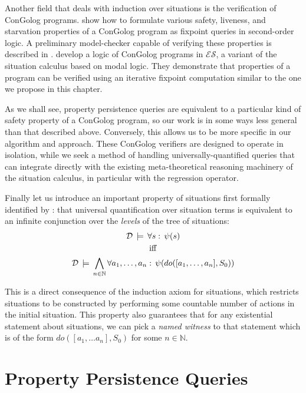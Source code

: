 Another field that deals with induction over situations is the verification
of ConGolog programs. \citet{ternovska97congolog_fixpoint} show how
to formulate various safety, liveness, and starvation properties of
a ConGolog program as fixpoint queries in second-order logic. A preliminary
model-checker capable of verifying these properties is described in
\citep{ternovska02congolog_model_checker}. \citet{classen08golog_properties}
develop a logic of ConGolog programs in $\mathcal{ES}$, a variant
of the situation calculus based on modal logic. They demonstrate that
properties of a program can be verified using an iterative fixpoint
computation similar to the one we propose in this chapter.

As we shall see, property persistence queries are equivalent to a
particular kind of safety property of a ConGolog program, so our work
is in some ways less general than that described above. Conversely,
this allows us to be more specific in our algorithm and approach.
These ConGolog verifiers are designed to operate in isolation, while
we seek a method of handling universally-quantified queries that can
integrate directly with the existing meta-theoretical reasoning machinery
of the situation calculus, in particular with the regression operator.

Finally let us introduce an important property of situations first
formally identified by \citet{savelli06sc_quantum_levels}: that universal
quantification over situation terms is equivalent to an infinite conjunction
over the \emph{levels} of the tree of situations:\begin{gather*}
\mathcal{D}\,\models\,\forall s:\,\psi(s)\\
\mathrm{iff}\\
\mathcal{D}\,\models\,\bigwedge_{n\in\mathbb{N}}\forall a_{1},\dots,a_{n}:\,\psi(do([a_{1},\dots,a_{n}],S_{0}))\end{gather*}


This is a direct consequence of the induction axiom for situations,
which restricts situations to be constructed by performing some countable
number of actions in the initial situation. This property also guarantees
that for any existential statement about situations, we can pick a
\emph{named witness} to that statement which is of the form $do([a_{1},\dots a_{n}],S_{0})$
for some $n\in\mathbb{N}$.


\section{Property Persistence Queries\label{sec:Persistence:Definitions}}


